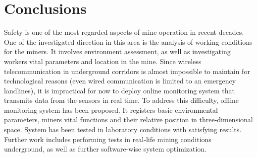 \documentclass[10pt, a4paper]{article}
\begin{document}
\section{Conclusions}
Safety is one of the most regarded aspects of mine operation in recent decades. One of the investigated direction in this area is the analysis of working conditions for the miners. It involves environment assessment, as well as investigating workers vital parameters and location in the mine. Since wireless telecommunication in underground corridors is almost impossible to maintain for technological reasons (even wired communication is limited to an emergency landlines), it is impractical for now to deploy online monitoring system that transmits data from the sensors in real time. To address this difficulty, offline monitoring system has been proposed. It registers basic environmental parameters, miners vital functions and their relative position in three-dimensional space. System has been tested in laboratory conditions with satisfying results. Further work includes performing tests in real-life mining conditions underground, as well as further software-wise system optimization.


\end{document}
